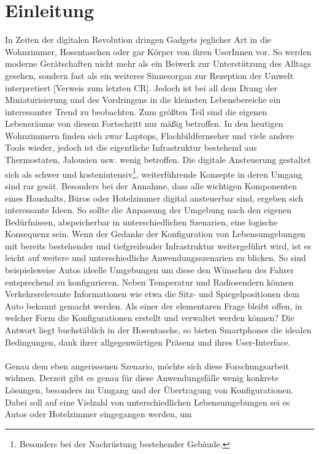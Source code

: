 \chapter{Einleitung}

In Zeiten der digitalen Revolution dringen Gadgets jeglicher Art in die Wohnzimmer, Hosentaschen oder gar Körper von ihren UserInnen vor. So werden moderne Gerätschaften 
nicht mehr als ein Beiwerk zur Unterstützung des Alltags gesehen, sondern fast als ein weiteres Sinnesorgan zur Rezeption der Umwelt interpretiert [Verweis zum letzten CR]. 
Jedoch ist bei all dem Drang der Miniaturisierung und des Vordringens in die kleinsten Lebensbereiche ein interessanter Trend zu beobachten. 
Zum größten Teil sind die eigenen Lebensräume von diesem Fortschritt nur mäßig betroffen. In den heutigen Wohnzimmern finden sich zwar Laptops, Flachbildfernseher und viele andere Tools wieder, jedoch ist die eigentliche Infrastruktur bestehend aus Thermostaten, Jalousien usw. wenig betroffen. Die digitale Ansteuerung gestaltet sich als schwer und
kostenintensiv\footnote{Besonders bei der Nachrüstung bestehender Gebäude.}, weiterführende  Konzepte in deren Umgang sind rar gesät. Besonders bei der Annahme, dass alle 
wichtigen Komponenten eines Haushalts, Büros oder Hotelzimmer digital ansteuerbar sind, ergeben sich interessante Ideen. So sollte die Anpassung der Umgebung nach den eigenen
 Bedürfnissen, abspeicherbar in unterschiedlichen Szenarien, eine logische Konsequenz sein. 
Wenn der Gedanke der Konfiguration von Lebensumgebungen mit bereits bestehender und tiefgreifender Infrastruktur weitergeführt wird, ist es leicht auf weitere und 
unterschiedliche Anwendungsszenarien zu blicken. 
So sind beispielsweise Autos ideelle Umgebungen um diese den Wünschen des Fahrer entsprechend zu konfigurieren. Neben Temperatur und Radiosendern können Verkehrsrelevante 
Informationen wie etwa die Sitz- und Spiegelpositionen dem Auto bekannt gemacht werden. Als einer der elementaren Frage bleibt offen, in welcher Form die Konfigurationen 
erstellt und verwaltet werden können? Die Antwort liegt buchstäblich in der Hosentasche, so bieten Smartphones die idealen Bedingungen, dank ihrer allgegenwärtigen Präsenz 
und ihres User-Interface.
\\\\
Genau dem eben angerissenen Szenario, möchte sich diese Forschungsarbeit widmen. Derzeit gibt es genau für diese Anwendungsfälle wenig konkrete Lösungen, besonders im 
Umgang und der Übertragung von Konfigurationen. Dabei soll auf eine Vielzahl von unterschiedlichen Lebensumgebungen sei es Autos oder Hotelzimmer eingegangen werden, um 
